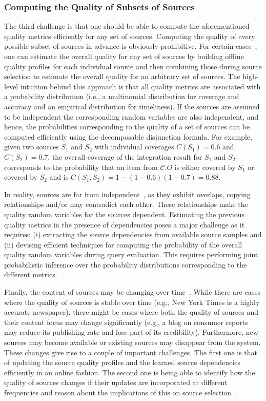 \documentclass{sig-alternate}
\begin{document}
\subsubsection{Computing the Quality of Subsets of Sources} 
The third challenge is that one should be able to compute the aforementioned quality metrics efficiently for any set of sources. Computing the quality of every possible subset of sources in advance is obviously prohibitive. For certain cases~\cite{dong:vldb13,rekatsinas:2014}, one can estimate the overall quality for any set of sources by building offline quality profiles for each individual source and then combining those during source selection to estimate the overall quality for an arbitrary set of sources. The high-level intuition behind this approach is that all quality metrics are associated with a probability distribution (i.e., a multinomial distribution for coverage and accuracy and an empirical distribution for timeliness). If the sources are assumed to be independent the corresponding random variables are also independent, and hence, the probabilities corresponding to the quality of a set of sources can be computed efficiently using the decomposable disjunction formula. For example, given two sources $S_1$ and $S_2$ with individual coverages $C(S_1) = 0.6$ and $C(S_2) = 0.7$, the overall coverage of the integration result for $S_1$ and $S_2$ corresponds to the probability that an item from $\mathcal{C}.O$ is either covered by $S_1$ or covered by $S_2$ and is $C(S_1,S_2) = 1 - (1-0.6)(1-0.7) = 0.88$.

In reality, sources are far from independent~\cite{berti-equille:sailing, dong:2009,pochampally:2014}, as they exhibit overlaps, copying relationships and/or may contradict each other. These relationships make the quality random variables for the sources dependent. Estimating the previous quality metrics in the presence of dependencies poses a major challenge as it requires: (i) extracting the source dependencies from available source samples and (ii) devising efficient techniques for computing the probability of the overall quality random variables during query evaluation. This requires performing joint probabilistic inference over the probability distributions corresponding to the different metrics.

Finally, the content of sources may be changing over time~\cite{rekatsinas:2014}. While there are cases where the quality of sources is stable over time (e.g., New York Times is a highly accurate newspaper), there might be cases where both the quality of sources and their content focus may change significantly (e.g., a  blog on consumer reports may reduce its publishing rate and lose part of its credibility). Furthermore, new sources may become available or existing sources may disappear from the system. These changes give rise to a couple of important challenges. The first one is that of updating the source quality profiles and the learned source dependencies efficiently in an online fashion. The second one is being able to identify how the quality of sources changes if their updates are incorporated at different frequencies and reason about the implications of this on source selection~\cite{rekatsinas:2014}.
\end{document}

